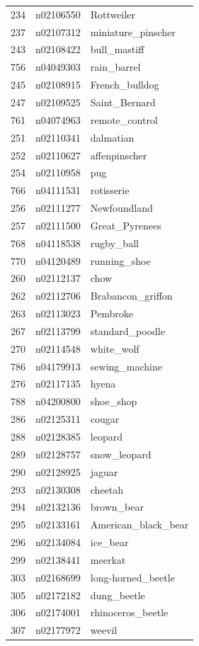\begin{table}
\begin{tabular}{cll}
234 & n02106550 & Rottweiler \\
237 & n02107312 & miniature_pinscher \\
243 & n02108422 & bull_mastiff \\
756 & n04049303 & rain_barrel \\
245 & n02108915 & French_bulldog \\
247 & n02109525 & Saint_Bernard \\
761 & n04074963 & remote_control \\
251 & n02110341 & dalmatian \\
252 & n02110627 & affenpinscher \\
254 & n02110958 & pug \\
766 & n04111531 & rotisserie \\
256 & n02111277 & Newfoundland \\
257 & n02111500 & Great_Pyrenees \\
768 & n04118538 & rugby_ball \\
770 & n04120489 & running_shoe \\
260 & n02112137 & chow \\
262 & n02112706 & Brabancon_griffon \\
263 & n02113023 & Pembroke \\
267 & n02113799 & standard_poodle \\
270 & n02114548 & white_wolf \\
786 & n04179913 & sewing_machine \\
276 & n02117135 & hyena \\
788 & n04200800 & shoe_shop \\
286 & n02125311 & cougar \\
288 & n02128385 & leopard \\
289 & n02128757 & snow_leopard \\
290 & n02128925 & jaguar \\
293 & n02130308 & cheetah \\
294 & n02132136 & brown_bear \\
295 & n02133161 & American_black_bear \\
296 & n02134084 & ice_bear \\
299 & n02138441 & meerkat \\
303 & n02168699 & long-horned_beetle \\
305 & n02172182 & dung_beetle \\
306 & n02174001 & rhinoceros_beetle \\
307 & n02177972 & weevil \\

\end{tabular}
\end{table}
